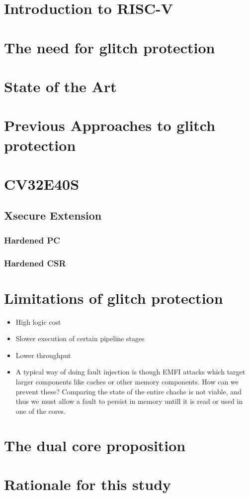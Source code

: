 \section{Introduction to RISC-V}
\section{The need for glitch protection}
\section{State of the Art}
\section{Previous Approaches to glitch protection}
\section{CV32E40S}
\label{sec:cv32}
\subsection{Xsecure Extension}
\subsubsection{Hardened PC}
\subsubsection{Hardened CSR}
\section{Limitations of glitch protection}
\label{sec:limits}

\begin{itemize}
    \item High logic cost 
    \item Slower execution of certain pipeline stages
    \item Lower throughput 
    \item A typical way of doing fault injection is though EMFI attacks which target larger components like caches or other memory components.
    How can we prevent these? Comparing the state of the entire chache is not viable, and thus we must allow a fault to persist in 
    memory untill it is read or used in one of the cores.
\end{itemize}
\section{The dual core proposition}
\section{Rationale for this study}

